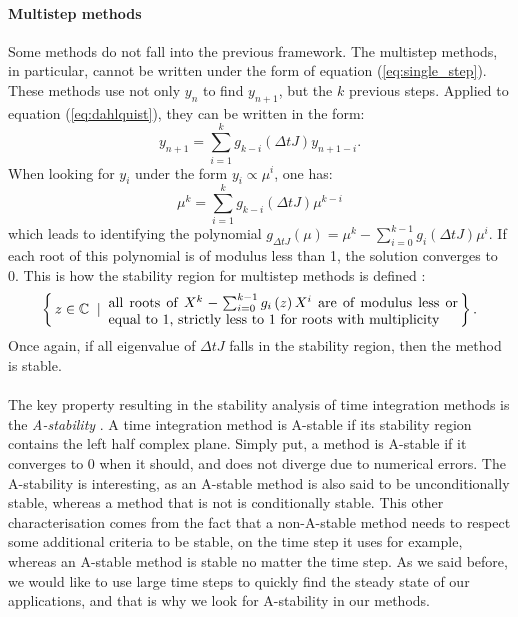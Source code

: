         \paragraph{Multistep methods}
        Some methods do not fall into the previous framework.
        The multistep methods, in particular, cannot be written under the form of equation (\ref{eq:single_step}).
        These methods use not only $y_n$ to find $y_{n+1}$, but the $k$ previous steps.
        Applied to equation (\ref{eq:dahlquist}), they can be written in the form:
        \begin{equation}
          y_{n+1} = \sum_{i=1}^k g_{k-i}\left(\Delta t J\right) y_{n+1-i} .
        \end{equation}
        When looking for $y_i$ under the form $y_i \propto \mu^{i}$, one has:
        \begin{equation}
          \mu^k = \sum_{i=1}^k g_{k-i}\left(\Delta t J\right) \mu^{k-i}
        \end{equation}
        which leads to identifying the polynomial $g_{\Delta t J}\left(\mu\right) = \mu^k - \sum_{i=0}^{k-1}g_i\left(\Delta t J\right)\mu^i$.
        If each root of this polynomial is of modulus less than 1, the solution converges to 0.
        This is how the stability region for multistep methods is defined \cite{HairerWanner1996}:
        \begin{equation}
          \left\{ \, z \in \mathbb{C} \; \mid \; \parbox{25em}{all roots of $X^k - \sum_{i=0}^{k-1}g_i\left(z\right)X^i$ are of modulus less or equal to 1, strictly less to 1 for roots with multiplicity}
           \, \right \} .
        \end{equation}
        Once again, if all eigenvalue of $\Delta t J$ falls in the stability region, then the method is stable.

        \paragraph{}
        The key property resulting in the stability analysis of time integration methods is the \emph{A-stability} \cite{Dahlquist1963}.
        A time integration method is A-stable if its stability region contains the left half complex plane.
        Simply put, a method is A-stable if it converges to 0 when it should, and does not diverge due to numerical errors.
        The A-stability is interesting, as an A-stable method is also said to be unconditionally stable, whereas a method that is not is conditionally stable.
        This other characterisation comes from the fact that a non-A-stable method needs to respect some additional criteria to be stable, on the time step it uses for example, whereas an A-stable method is stable no matter the time step.
        As we said before, we would like to use large time steps to quickly find the steady state of our applications, and that is why we look for A-stability in our methods.


